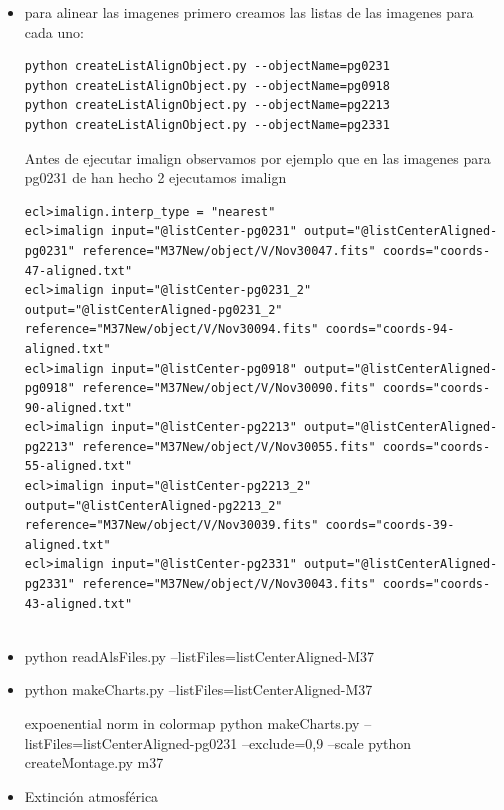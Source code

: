 \documentclass{article}
\begin{document}
\begin{itemize}
{\begin{verbatim}
\end{verbatim}
}

\item 

para alinear las imagenes primero creamos las listas de las imagenes para cada uno:

\begin{verbatim}
python createListAlignObject.py --objectName=pg0231
python createListAlignObject.py --objectName=pg0918
python createListAlignObject.py --objectName=pg2213
python createListAlignObject.py --objectName=pg2331

\end{verbatim}
Antes de ejecutar imalign observamos por ejemplo que en las imagenes para pg0231 de han hecho 2
ejecutamos imalign


{\tiny 
\begin{verbatim}
ecl>imalign.interp_type = "nearest" 
ecl>imalign input="@listCenter-pg0231" output="@listCenterAligned-pg0231" reference="M37New/object/V/Nov30047.fits" coords="coords-47-aligned.txt"
ecl>imalign input="@listCenter-pg0231_2" output="@listCenterAligned-pg0231_2" reference="M37New/object/V/Nov30094.fits" coords="coords-94-aligned.txt"
ecl>imalign input="@listCenter-pg0918" output="@listCenterAligned-pg0918" reference="M37New/object/V/Nov30090.fits" coords="coords-90-aligned.txt"
ecl>imalign input="@listCenter-pg2213" output="@listCenterAligned-pg2213" reference="M37New/object/V/Nov30055.fits" coords="coords-55-aligned.txt"
ecl>imalign input="@listCenter-pg2213_2" output="@listCenterAligned-pg2213_2" reference="M37New/object/V/Nov30039.fits" coords="coords-39-aligned.txt"
ecl>imalign input="@listCenter-pg2331" output="@listCenterAligned-pg2331" reference="M37New/object/V/Nov30043.fits" coords="coords-43-aligned.txt"


\end{verbatim}
}

\item python readAlsFiles.py --listFiles=listCenterAligned-M37
\item python makeCharts.py --listFiles=listCenterAligned-M37

expoenential norm in colormap
 python makeCharts.py --listFiles=listCenterAligned-pg0231 --exclude=0,9 --scale
python createMontage.py m37

\item Extinción atmosférica
\end{itemize}
\end{document}

